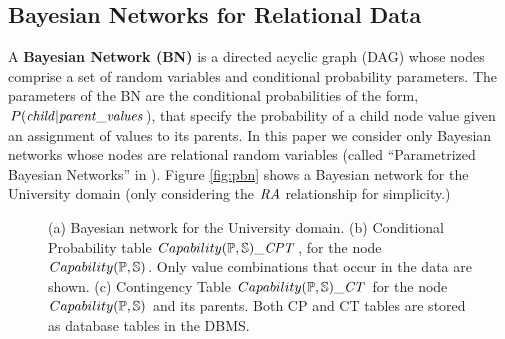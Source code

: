 \documentclass{acm_proc_article-sp}
\begin{document}
\subsection{Bayesian Networks for Relational Data}
A {\bf Bayesian Network (BN)} is a directed acyclic graph (DAG) whose nodes comprise a set of random variables and conditional probability parameters.
The parameters of the BN  
are the conditional probabilities of the form, $P(\it{child}|\it{parent\_values}$), that specify the probability of a child node value given an assignment of values to its parents. 
In this paper we consider only Bayesian networks whose nodes are relational random variables (called ``Parametrized Bayesian Networks'' in \cite{Poole2003}). 
Figure \ref{fig:pbn} shows a Bayesian network for the University domain (only considering the $\ra$ relationship for simplicity.) 
\begin{figure}[htbp] %
 \centering
{} 
\caption{(a) Bayesian network for the University domain. (b) Conditional Probability table $Capability(\P,\S)\_\cptable$, for the node $Capability(\P,\S)$. Only value combinations that occur in the data are shown. (c) Contingency Table $Capability(\P,\S)\_\cttable$ for the node $Capability(\P,\S)$ and its parents. Both CP and CT tables are stored as database tables in the DBMS.
}
 \label{fig:pbn}
\label{fig:ct-cp-table}
\end{figure}



\end{document}
